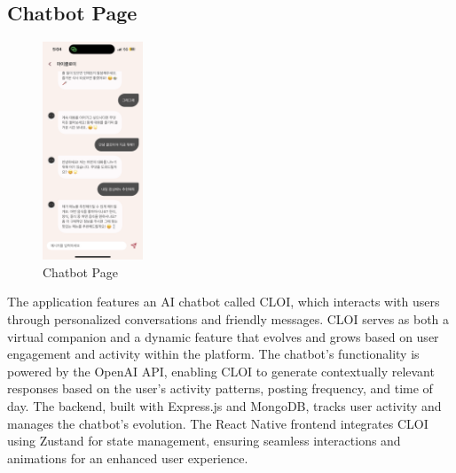 \subsection{Chatbot Page}
        \begin{figure}[htbp]
            \centerline{\includegraphics[width=3cm]{Images/page/chatbot.png}}
            \caption{Chatbot Page}
            \label{fig}
        \end{figure}
        The application features an AI chatbot called CLOI, which interacts with users through personalized conversations and friendly messages. CLOI serves as both a virtual companion and a dynamic feature that evolves and grows based on user engagement and activity within the platform.
        The chatbot's functionality is powered by the OpenAI API, enabling CLOI to generate contextually relevant responses based on the user's activity patterns, posting frequency, and time of day.
        The backend, built with Express.js and MongoDB, tracks user activity and manages the chatbot's evolution. The React Native frontend integrates CLOI using Zustand for state management, ensuring seamless interactions and animations for an enhanced user experience.


